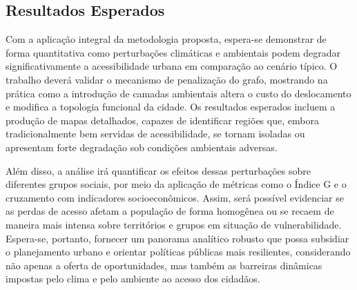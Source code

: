 \subsection{Resultados Esperados}

Com a aplicação integral da metodologia proposta, espera-se demonstrar de forma quantitativa como perturbações climáticas e ambientais podem degradar significativamente a acessibilidade urbana em comparação ao cenário típico. O trabalho deverá validar o mecanismo de penalização do grafo, mostrando na prática como a introdução de camadas ambientais altera o custo do deslocamento e modifica a topologia funcional da cidade. Os resultados esperados incluem a produção de mapas detalhados, capazes de identificar regiões que, embora tradicionalmente bem servidas de acessibilidade, se tornam isoladas ou apresentam forte degradação sob condições ambientais adversas.

Além disso, a análise irá quantificar os efeitos dessas perturbações sobre diferentes grupos sociais, por meio da aplicação de métricas como o Índice G e o cruzamento com indicadores socioeconômicos. Assim, será possível evidenciar se as perdas de acesso afetam a população de forma homogênea ou se recaem de maneira mais intensa sobre territórios e grupos em situação de vulnerabilidade. Espera-se, portanto, fornecer um panorama analítico robusto que possa subsidiar o planejamento urbano e orientar políticas públicas mais resilientes, considerando não apenas a oferta de oportunidades, mas também as barreiras dinâmicas impostas pelo clima e pelo ambiente ao acesso dos cidadãos.